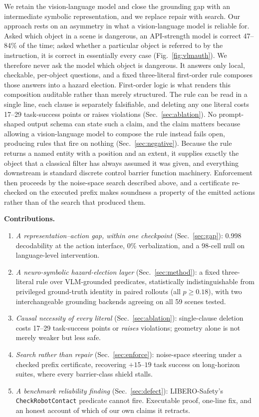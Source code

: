 \documentclass[conference]{IEEEtran}
\begin{document}
We retain the vision-language model and close the grounding gap with an intermediate symbolic representation, and we replace repair with search. Our approach rests on an asymmetry in what a vision-language model is reliable for. Asked which object in a scene is dangerous, an API-strength model is correct 47--84\% of the time; asked whether a particular object is referred to by the instruction, it is correct in essentially every case (Fig.~\ref{fig:vlmauth}). We therefore never ask the model which object is dangerous. It answers only local, checkable, per-object questions, and a fixed three-literal first-order rule composes those answers into a hazard election. First-order logic is what renders this composition auditable rather than merely structured. The rule can be read in a single line, each clause is separately falsifiable, and deleting any one literal costs 17--29 task-success points or raises violations (Sec.~\ref{sec:ablation}). No prompt-shaped output schema can state such a claim, and the claim matters because allowing a vision-language model to compose the rule instead fails open, producing rules that fire on nothing (Sec.~\ref{sec:negative}). Because the rule returns a named entity with a position and an extent, it supplies exactly the object that a classical filter has always assumed it was given, and everything downstream is standard discrete control barrier function machinery. Enforcement then proceeds by the noise-space search described above, and a certificate re-checked on the executed prefix makes soundness a property of the emitted actions rather than of the search that produced them.

\textbf{Contributions.}
\begin{enumerate}
\item \emph{A representation--action gap, within one checkpoint} (Sec.~\ref{sec:gap}): 0.998 decodability at the action interface, 0\% verbalization, and a 98-cell null on language-level intervention.
\item \emph{A neuro-symbolic hazard-election layer} (Sec.~\ref{sec:method}): a fixed three-literal rule over VLM-grounded predicates, statistically indistinguishable from privileged ground-truth identity in paired rollouts (all $p\ge0.18$), with two interchangeable grounding backends agreeing on all 59 scenes tested.
\item \emph{Causal necessity of every literal} (Sec.~\ref{sec:ablation}): single-clause deletion costs 17--29 task-success points or \emph{raises} violations; geometry alone is not merely weaker but less safe.
\item \emph{Search rather than repair} (Sec.~\ref{sec:enforce}): noise-space steering under a checked prefix certificate, recovering $+15$--$19$ task success on long-horizon suites, where every barrier-class shield stalls.
\item \emph{A benchmark reliability finding} (Sec.~\ref{sec:defect}): LIBERO-Safety's \texttt{CheckRobotContact} predicate cannot fire. Executable proof, one-line fix, and an honest account of which of our own claims it retracts.
\end{enumerate}
\end{document}
